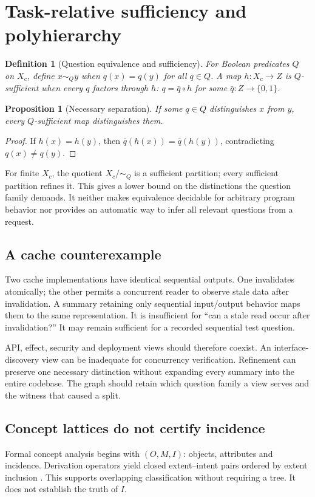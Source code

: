 \documentclass[11pt]{article}
\newtheorem{proposition}{Proposition}\newtheorem{definition}{Definition}
\begin{document}
\section{Task-relative sufficiency and polyhierarchy}
\begin{definition}[Question equivalence and sufficiency]
For Boolean predicates $Q$ on $X_c$, define $x\sim_Q y$ when $q(x)=q(y)$ for all $q\in Q$. A map $h:X_c\to Z$ is $Q$-sufficient when every $q$ factors through $h$: $q=\bar q\circ h$ for some $\bar q:Z\to\{0,1\}$.
\end{definition}
\begin{proposition}[Necessary separation]
If some $q\in Q$ distinguishes $x$ from $y$, every $Q$-sufficient map distinguishes them.
\end{proposition}
\begin{proof}
If $h(x)=h(y)$, then $\bar q(h(x))=\bar q(h(y))$, contradicting $q(x)\ne q(y)$.
\end{proof}
For finite $X_c$, the quotient $X_c/{\sim_Q}$ is a sufficient partition; every sufficient partition refines it. This gives a lower bound on the distinctions the question family demands. It neither makes equivalence decidable for arbitrary program behavior nor provides an automatic way to infer all relevant questions from a request.

\subsection{A cache counterexample}
Two cache implementations have identical sequential outputs. One invalidates atomically; the other permits a concurrent reader to observe stale data after invalidation. A summary retaining only sequential input/output behavior maps them to the same representation. It is insufficient for ``can a stale read occur after invalidation?'' It may remain sufficient for a recorded sequential test question.

API, effect, security and deployment views should therefore coexist. An interface-discovery view can be inadequate for concurrency verification. Refinement can preserve one necessary distinction without expanding every summary into the entire codebase. The graph should retain which question family a view serves and the witness that caused a split.

\subsection{Concept lattices do not certify incidence}
Formal concept analysis begins with $(O,M,I)$: objects, attributes and incidence. Derivation operators yield closed extent--intent pairs ordered by extent inclusion \citep{ganter1999}. This supports overlapping classification without requiring a tree. It does not establish the truth of $I$.
\end{document}
